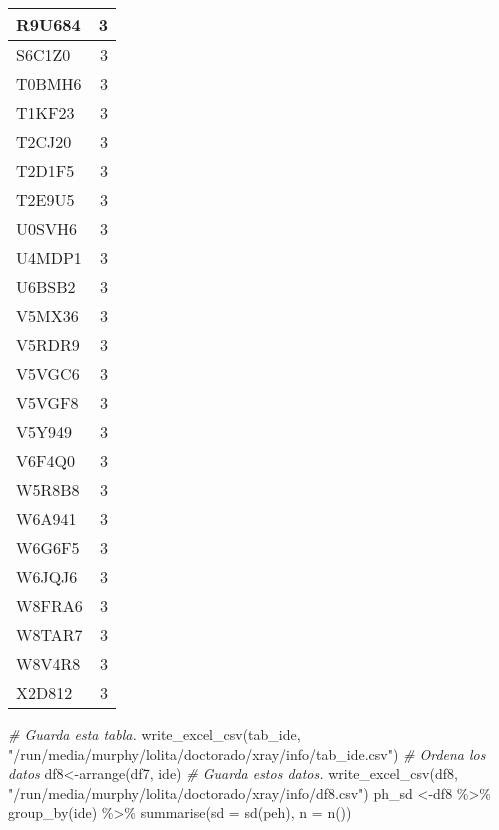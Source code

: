 \documentclass[
]{book}
\newenvironment{Shaded}{\begin{snugshade}}{\end{snugshade}}
\newcommand{\AttributeTok}[1]{\textcolor[rgb]{0.77,0.63,0.00}{#1}}
\newcommand{\CommentTok}[1]{\textcolor[rgb]{0.56,0.35,0.01}{\textit{#1}}}
\newcommand{\FunctionTok}[1]{\textcolor[rgb]{0.00,0.00,0.00}{#1}}
\newcommand{\NormalTok}[1]{#1}
\newcommand{\OtherTok}[1]{\textcolor[rgb]{0.56,0.35,0.01}{#1}}
\newcommand{\SpecialCharTok}[1]{\textcolor[rgb]{0.00,0.00,0.00}{#1}}
\newcommand{\StringTok}[1]{\textcolor[rgb]{0.31,0.60,0.02}{#1}}
\theoremstyle{definition}
\theoremstyle{definition}
\theoremstyle{definition}
\theoremstyle{definition}
\theoremstyle{remark}
\begin{document}
\begin{table}
\begin{tabular}{l|r}
\hline
R9U684 & 3\\
\hline
S6C1Z0 & 3\\
\hline
T0BMH6 & 3\\
\hline
T1KF23 & 3\\
\hline
T2CJ20 & 3\\
\hline
T2D1F5 & 3\\
\hline
T2E9U5 & 3\\
\hline
U0SVH6 & 3\\
\hline
U4MDP1 & 3\\
\hline
U6BSB2 & 3\\
\hline
V5MX36 & 3\\
\hline
V5RDR9 & 3\\
\hline
V5VGC6 & 3\\
\hline
V5VGF8 & 3\\
\hline
V5Y949 & 3\\
\hline
V6F4Q0 & 3\\
\hline
W5R8B8 & 3\\
\hline
W6A941 & 3\\
\hline
W6G6F5 & 3\\
\hline
W6JQJ6 & 3\\
\hline
W8FRA6 & 3\\
\hline
W8TAR7 & 3\\
\hline
W8V4R8 & 3\\
\hline
X2D812 & 3\\
\hline
\end{tabular}
\end{table}

\begin{Shaded}
\begin{Highlighting}[]
\CommentTok{\# Guarda esta tabla.}
\FunctionTok{write\_excel\_csv}\NormalTok{(tab\_ide, }\StringTok{"/run/media/murphy/lolita/doctorado/xray/info/tab\_ide.csv"}\NormalTok{)}
\CommentTok{\# Ordena los datos}
\NormalTok{df8}\OtherTok{\textless{}{-}}\FunctionTok{arrange}\NormalTok{(df7, ide)}
\CommentTok{\# Guarda estos datos.}
\FunctionTok{write\_excel\_csv}\NormalTok{(df8, }\StringTok{"/run/media/murphy/lolita/doctorado/xray/info/df8.csv"}\NormalTok{)}
\NormalTok{ph\_sd }\OtherTok{\textless{}{-}}\NormalTok{df8 }\SpecialCharTok{\%\textgreater{}\%}
  \FunctionTok{group\_by}\NormalTok{(ide) }\SpecialCharTok{\%\textgreater{}\%}
  \FunctionTok{summarise}\NormalTok{(}\AttributeTok{sd =} \FunctionTok{sd}\NormalTok{(peh), }\AttributeTok{n =} \FunctionTok{n}\NormalTok{())}
\end{Highlighting}
\end{Shaded}
\end{document}
